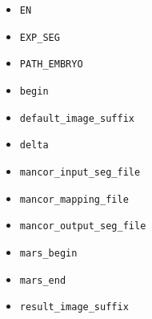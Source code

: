 \begin{itemize}
\itemsep -0.5ex
\item \texttt{EN}
\item \texttt{EXP\_SEG}
\item \texttt{PATH\_EMBRYO}
\item \texttt{begin}
\item \texttt{default\_image\_suffix}
\item \texttt{delta}
\item \texttt{mancor\_input\_seg\_file}
\item \texttt{mancor\_mapping\_file}
\item \texttt{mancor\_output\_seg\_file}
\item \texttt{mars\_begin}
\item \texttt{mars\_end}
\item \texttt{result\_image\_suffix}
\end{itemize}
